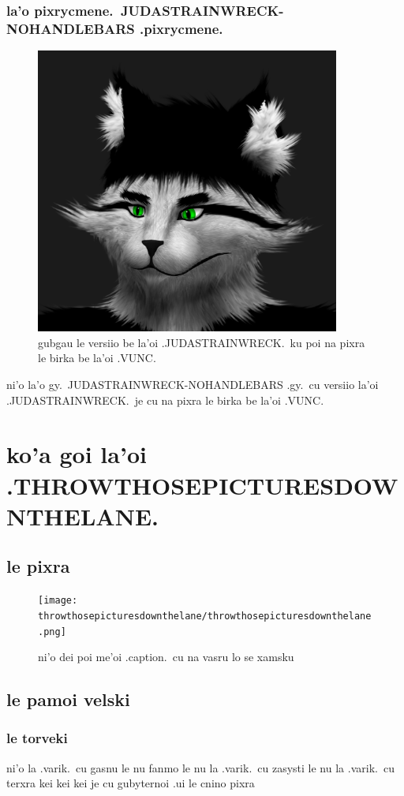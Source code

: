 \documentclass{report}
\begin{document}
\subsection{la'o pixrycmene.\ JUDASTRAINWRECK\hyp NOHANDLEBARS .pixrycmene.}
\begin{figure}[ht]
	\centering
	\includegraphics[width=10cm]{judastrainwreck/judastrainwreck-nohandlebars.png}
	\caption[center]{gubgau le versiio be la'oi .JUDASTRAINWRECK.\ ku poi na pixra le birka be la'oi .VUNC.}
\end{figure}
ni'o la'o gy.\ JUDASTRAINWRECK\hyp NOHANDLEBARS .gy.\ cu versiio la'oi .JUDASTRAINWRECK.\ je cu na pixra le birka be la'oi .VUNC.

\chapter{ko'a goi la'oi .THROWTHOSEPICTURESDOWNTHELANE.}
\section{le pixra}
\begin{figure}[ht]
	\centering
	\texttt{[image: throwthosepicturesdownthelane/throwthosepicturesdownthelane.png]}
	\caption[center]{ni'o dei poi me'oi .caption.\ cu na vasru lo se xamsku}
\end{figure}
\section{le pamoi velski}
\subsection{le torveki}
ni'o la .varik.\ cu gasnu le nu fanmo le nu la .varik.\ cu zasysti le nu la .varik.\ cu terxra kei kei kei je cu gubyternoi .ui le cnino pixra
\end{document}
